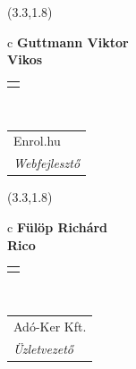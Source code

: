 \documentclass[11pt]{article}
\begin{document}
\makebox(3.3,1.8){
  \renewcommand\arraystretch{1.3}
  \begin{tabular}[c]{c}
    \hspace{8.5mm}
    \LARGE\bf{ Guttmann Viktor }\\
    \hspace{8.5mm}
    \Large{ Vikos }\\
    \renewcommand\arraystretch{3}
    \begin{tabular}[c]{c}
      \centering
      \fontfamily{phv}\selectfont{
        \textbf{
          \textsc{
            \scriptsize{
            \color{Dark}{ Ismerkedő }\color{Bright}{ Webmester }\color{Bright}{ Sminkmester }\color{Bright}{ Programozó }
            }
          }
        }
      }
    \end{tabular}
    \\
    \renewcommand\arraystretch{1}
    \begin{tabular}{p{3.3in}}
      \hspace{.7cm}Enrol.hu\\
      \hspace{.7cm}\emph{ Webfejlesztő }\\
    \end{tabular}
  \end{tabular}
}

\makebox(3.3,1.8){
  \renewcommand\arraystretch{1.3}
  \begin{tabular}[c]{c}
    \hspace{8.5mm}
    \LARGE\bf{ Fülöp Richárd }\\
    \hspace{8.5mm}
    \Large{ Rico }\\
    \renewcommand\arraystretch{3}
    \begin{tabular}[c]{c}
      \centering
      \fontfamily{phv}\selectfont{
        \textbf{
          \textsc{
            \scriptsize{
            \color{Bright}{ Ismerkedő }\color{Dark}{ Webmester }\color{Dark}{ Sminkmester }\color{Bright}{ Programozó }
            }
          }
        }
      }
    \end{tabular}
    \\
    \renewcommand\arraystretch{1}
    \begin{tabular}{p{3.3in}}
      \hspace{.7cm}Adó-Ker Kft.\\
      \hspace{.7cm}\emph{ Üzletvezető }\\
    \end{tabular}
  \end{tabular}
}
\end{document}
